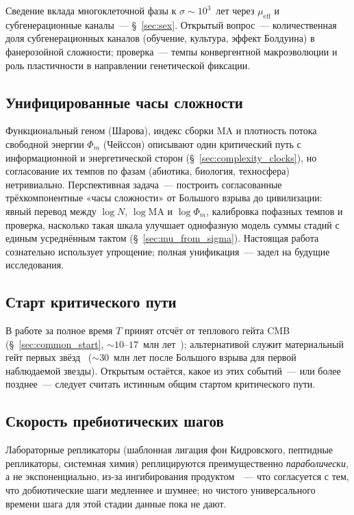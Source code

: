 \documentclass[12pt,a4paper]{article}
\begin{document}
Сведение вклада многоклеточной фазы к $\sigma \sim 10^3$~лет через $\mu_{\mathrm{eff}}$ и субгенерационные каналы~--- \S~\ref{sec:sex}. Открытый вопрос~--- количественная доля субгенерационных каналов (обучение, культура, эффект Болдуина) в фанерозойной сложности; проверка~--- темпы конвергентной макроэволюции и роль пластичности в направлении генетической фиксации.

\subsection{Унифицированные часы сложности}
\label{sec:unified_clocks}

Функциональный геном (Шарова), индекс сборки MA и плотность потока свободной энергии $\Phi_m$ (Чейссон) описывают один критический путь с информационной и энергетической сторон (\S~\ref{sec:complexity_clocks}), но согласование их темпов по фазам (абиотика, биология, техносфера) нетривиально. Перспективная задача~--- построить согласованные трёхкомпонентные «часы сложности» от Большого взрыва до цивилизации: явный перевод между $\log N$, $\log \mathrm{MA}$ и $\log \Phi_m$, калибровка пофазных темпов и проверка, насколько такая шкала улучшает однофазную модель суммы стадий с единым усреднённым тактом (\S~\ref{sec:mu_from_sigma}). Настоящая работа сознательно использует упрощение; полная унификация~--- задел на будущие исследования.

\subsection{Старт критического пути}
\label{sec:open_start}

В работе за полное время $T$ принят отсчёт от теплового гейта CMB (\S~\ref{sec:common_start}, $\sim 10$--$17$~млн лет~\cite{Loeb2014}); альтернативой служит материальный гейт первых звёзд~\cite{Naoz2006} ($\sim 30$~млн лет после Большого взрыва для первой наблюдаемой звезды). Открытым остаётся, какое из этих событий~--- или более позднее~--- следует считать истинным общим стартом критического пути.

\subsection{Скорость пребиотических шагов}
\label{sec:open_prebiotic_tempo}

Лабораторные репликаторы (шаблонная лигация фон Кидровского, пептидные репликаторы, системная химия) реплицируются преимущественно \emph{параболически}, а не экспоненциально, из-за ингибирования продуктом~\cite{Adamski2020}~--- что согласуется с тем, что добиотические шаги медленнее и шумнее; но чистого универсального времени шага для этой стадии данные пока не дают.
\end{document}
